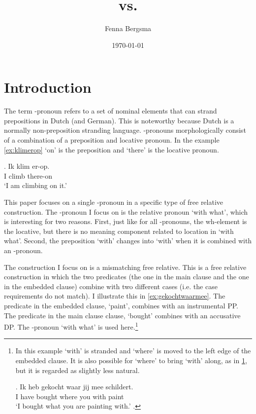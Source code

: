 \documentclass{article}
\title{\tit{Waarmee} vs. \tit{met wat}}
\author{Fenna Bergsma}
\date{\today}
\begin{document}
\maketitle






\section{Introduction}

The term -pronoun \citep{riemsdijk1978} refers to a set of nominal elements that can strand prepositions in Dutch (and German). This is noteworthy because Dutch is a normally non-preposition stranding language. -pronouns morphologically consist of a combination of a preposition and locative pronoun. In the example \ref{ex:klimerop}  `on' is the preposition and  `there' is the locative pronoun.

\exg. Ik klim er-op.\\
 I climb there-on\\
 `I am climbing on it.'\label{ex:klimerop}

This paper focuses on a single -pronoun in a specific type of free relative construction. The -pronoun I focus on is the relative pronoun  `with what', which is interesting for two reasons. First, just like for all -pronouns, the wh-element is the locative, but there is no meaning component related to location in `with what'. Second, the preposition  `with' changes into  `with' when it is combined with an -pronoun.

The construction I focus on is a mismatching free relative. This is a free relative construction in which the two predicates (the one in the main clause and the one in the embedded clause) combine with two different cases (i.e. the case requirements do not match). I illustrate this in \ref{ex:gekochtwaarmee}. The predicate in the embedded clause,  `paint', combines with an instrumental PP. The predicate in the main clause clause,  `bought' combines with an accusative DP. The -pronoun  `with what' is used here.\footnote{In this example  `with' is stranded and  `where' is moved to the left edge of the embedded clause. It is also possible for  `where' to bring  `with' along, as in \ref{ex:meealong}, but it is regarded as slightly less natural.

\exg. Ik heb gekocht waar jij mee schildert.\\
 I have bought where you with paint\\
 `I bought what you are painting with.'\label{ex:meealong}
\z.

\phantom{x}
}
\end{document}
